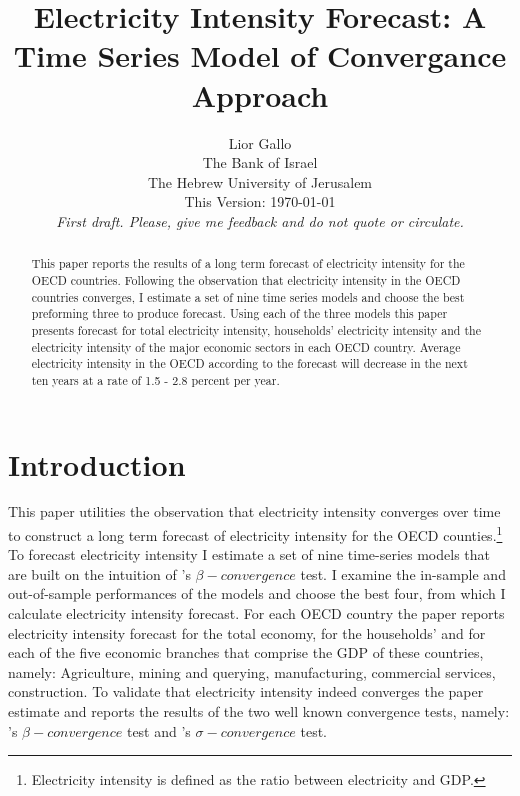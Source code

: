 \documentclass[]{amsart}
\title{Electricity Intensity Forecast: A Time Series Model of Convergance Approach}
\author{Lior Gallo \\
The Bank of Israel \\
The Hebrew University of Jerusalem \\
This Version: \today \\
\textit{First draft. Please, give me feedback and do not quote or circulate. }}
\begin{document}
\maketitle
	\begin{abstract}
	This paper reports the results of a long term forecast of electricity intensity for the OECD countries. Following the observation that electricity intensity in the OECD countries converges, I estimate a set of nine time series models and choose the best preforming three to produce forecast. Using each of the three models this paper presents forecast for total electricity intensity, households' electricity intensity and the electricity intensity of the major economic sectors in each OECD country. Average electricity intensity in the OECD according to the forecast will decrease in the next ten years at a rate  of 1.5 - 2.8 percent per year.
	\end{abstract}

\newpage

\tableofcontents

\newpage

\section{Introduction}

This paper utilities the observation that electricity intensity converges over time to construct a long term forecast of electricity intensity for the OECD counties.\footnote{Electricity intensity is defined as the ratio between electricity and GDP.} To forecast electricity intensity I estimate a set of nine time-series models that are built on the intuition of \cite{barro1992convergence}'s $\beta-convergence$ test. I examine the in-sample and out-of-sample performances of the models and choose the best four, from which I calculate electricity intensity forecast. For each OECD country the paper reports electricity intensity forecast for the total economy, for the households' and for each of the five economic branches that comprise the GDP of these countries, namely: Agriculture, mining and querying, manufacturing, commercial services, construction. To validate that electricity intensity indeed converges the paper estimate and reports the results of the two well known convergence tests, namely: \cite{barro1992convergence}'s $\beta-convergence$ test and \cite{PhillipsSul2007}'s $\sigma-convergence$ test. 

\bigskip
\end{document}
